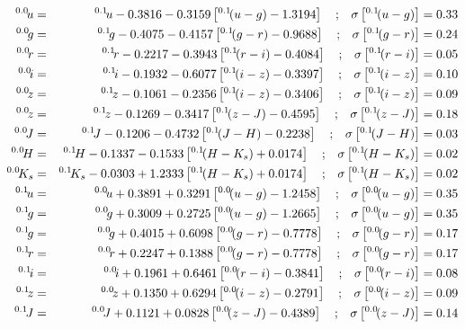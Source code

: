 \documentclass[10pt,preprint]{aastex}
\newcommand{\band}[2]{\ensuremath{^{{#1}}\!{#2}}}
\begin{document}
 
\begin{eqnarray}
\band{0.0}{u} &=& \band{0.1}{u} - 0.3816 - 0.3159 \left[ \band{0.1}{(u-g)} - 1.3194 \right] \quad \mathrm{;}  \quad \sigma\left[\band{0.1}{(u-g)}\right] = 0.33\cr
\band{0.0}{g} &=& \band{0.1}{g} - 0.4075 - 0.4157 \left[ \band{0.1}{(g-r)} - 0.9688 \right] \quad \mathrm{;}  \quad \sigma\left[\band{0.1}{(g-r)}\right] = 0.24\cr
\band{0.0}{r} &=& \band{0.1}{r} - 0.2217 - 0.3943 \left[ \band{0.1}{(r-i)} - 0.4084 \right] \quad \mathrm{;}  \quad \sigma\left[\band{0.1}{(r-i)}\right] = 0.05\cr
\band{0.0}{i} &=& \band{0.1}{i} - 0.1932 - 0.6077 \left[ \band{0.1}{(i-z)} - 0.3397 \right] \quad \mathrm{;}  \quad \sigma\left[\band{0.1}{(i-z)}\right] = 0.10\cr
\band{0.0}{z} &=& \band{0.1}{z} - 0.1061 - 0.2356 \left[ \band{0.1}{(i-z)} - 0.3406 \right] \quad \mathrm{;}  \quad \sigma\left[\band{0.1}{(i-z)}\right] = 0.09\cr
\band{0.0}{z} &=& \band{0.1}{z} - 0.1269 - 0.3417 \left[ \band{0.1}{(z-J)} - 0.4595 \right] \quad \mathrm{;}  \quad \sigma\left[\band{0.1}{(z-J)}\right] = 0.18\cr
\band{0.0}{J} &=& \band{0.1}{J} - 0.1206 - 0.4732 \left[ \band{0.1}{(J-H)} - 0.2238 \right] \quad \mathrm{;}  \quad \sigma\left[\band{0.1}{(J-H)}\right] = 0.03\cr
\band{0.0}{H} &=& \band{0.1}{H} - 0.1337 - 0.1533 \left[ \band{0.1}{(H-K_s)} + 0.0174 \right] \quad \mathrm{;}  \quad \sigma\left[\band{0.1}{(H-K_s)}\right] = 0.02\cr
\band{0.0}{K_s} &=& \band{0.1}{K_s} - 0.0303 + 1.2333 \left[ \band{0.1}{(H-K_s)} + 0.0174 \right] \quad \mathrm{;}  \quad \sigma\left[\band{0.1}{(H-K_s)}\right] = 0.02\cr
\band{0.1}{u} &=& \band{0.0}{u} + 0.3891 + 0.3291 \left[ \band{0.0}{(u-g)} - 1.2458 \right] \quad \mathrm{;}  \quad \sigma\left[\band{0.0}{(u-g)}\right] = 0.35\cr
\band{0.1}{g} &=& \band{0.0}{g} + 0.3009 + 0.2725 \left[ \band{0.0}{(u-g)} - 1.2665 \right] \quad \mathrm{;}  \quad \sigma\left[\band{0.0}{(u-g)}\right] = 0.35\cr
\band{0.1}{g} &=& \band{0.0}{g} + 0.4015 + 0.6098 \left[ \band{0.0}{(g-r)} - 0.7778 \right] \quad \mathrm{;}  \quad \sigma\left[\band{0.0}{(g-r)}\right] = 0.17\cr
\band{0.1}{r} &=& \band{0.0}{r} + 0.2247 + 0.1388 \left[ \band{0.0}{(g-r)} - 0.7778 \right] \quad \mathrm{;}  \quad \sigma\left[\band{0.0}{(g-r)}\right] = 0.17\cr
\band{0.1}{i} &=& \band{0.0}{i} + 0.1961 + 0.6461 \left[ \band{0.0}{(r-i)} - 0.3841 \right] \quad \mathrm{;}  \quad \sigma\left[\band{0.0}{(r-i)}\right] = 0.08\cr
\band{0.1}{z} &=& \band{0.0}{z} + 0.1350 + 0.6294 \left[ \band{0.0}{(i-z)} - 0.2791 \right] \quad \mathrm{;}  \quad \sigma\left[\band{0.0}{(i-z)}\right] = 0.09\cr
\band{0.1}{J} &=& \band{0.0}{J} + 0.1121 + 0.0828 \left[ \band{0.0}{(z-J)} - 0.4389 \right] \quad \mathrm{;}  \quad \sigma\left[\band{0.0}{(z-J)}\right] = 0.14\cr

\end{eqnarray}
\end{document}
